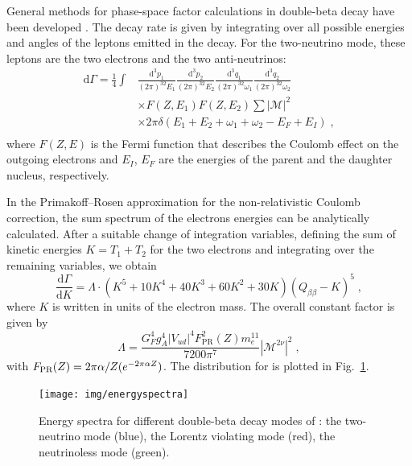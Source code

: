 General methods for phase-space factor calculations in double-beta decay have been developed \cite{Doi:1981,Doi:1983,Tomoda:1991}. The decay rate is given by integrating over all possible energies and angles of the leptons emitted in the decay. For the two-neutrino mode, these leptons are the two electrons and the two anti-neutrinos:
\begin{equation}\begin{split}
		\text{d}\Gamma=\frac{1}{4}\int & \frac{\text{d}^3p_1}{(2\pi)^32E_1}\frac{\text{d}^3p_2}{(2\pi)^32E_2}\frac{\text{d}^3q_1}{(2\pi)^32\omega_1}\frac{\text{d}^3q_2}{(2\pi)^32\omega_2} \\
									   & \times F(Z,E_1)F(Z,E_2)\sum|\mathcal{M}|^2 \\
									   & \times 2\pi\delta(E_1+E_2+\omega_1+\omega_2-E_F+E_I)\;, \\
\end{split}\end{equation}
where $F(Z,E)$ is the Fermi function that describes the Coulomb effect on the outgoing electrons and $E_I$, $E_F$ are the energies of the parent and the daughter nucleus, respectively.

In the Primakoff–Rosen approximation \cite{PrimakoffRosen} for the non-relativistic Coulomb correction, the sum spectrum of the electrons energies can be analytically calculated. After a suitable change of integration variables, defining the sum of kinetic energies $K=T_1+T_2$ for the two electrons and integrating over the remaining variables, we obtain
\begin{equation}\frac{\text{d}\Gamma}{\text{d}K}=\Lambda\cdot(K^5+10K^4+40K^3+60K^2+30K)(Q_{\beta\beta}-K)^5\;,\label{eq:spectstd}\end{equation}
where $K$ is written in units of the electron mass. The overall constant factor is given by
\begin{equation}\Lambda=\frac{G_F^4g_A^4|V_{ud}|^4F^2_\text{PR}(Z)m_e^{11}}{7200\pi^7}|\mathcal{M}^{2\nu}|^2\;,\end{equation}
with $F_\text{PR}(Z)=2\pi\alpha/Z(\-e^{-2\pi\alpha Z})$. The distribution for  is plotted in Fig.~\ref{fig:energyspectra}.
\begin{figure}
	\centering
	\texttt{[image: img/energyspectra]}
	\caption{Energy spectra for different double-beta decay modes of : the two-neutrino mode (blue), the Lorentz violating mode (red), the neutrinoless mode (green).}
	\label{fig:energyspectra}
\end{figure}

